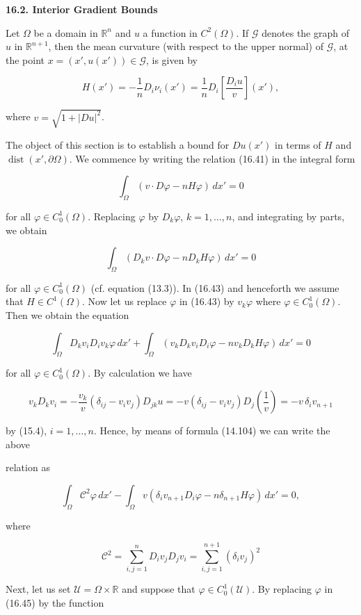 \textbf{16.2. Interior Gradient Bounds}

Let $\Omega$ be a domain in $\mathbb{R}^n$ and $u$ a function in $C^2(\Omega)$. If $\mathcal{G}$ denotes the graph of $u$
in $\mathbb{R}^{n+1}$, then the mean curvature (with respect to the upper normal) of $\mathcal{G}$, at the
point $x=(x',u(x'))\in\mathcal{G}$, is given by

\[
\tag{16.41}
H(x')=-\frac{1}{n}D_i\nu_i(x')
=\frac{1}{n}D_i\!\left[\frac{D_i u}{v}\right](x'),
\]

where $v=\sqrt{1+|Du|^2}$.

The object of this section is to establish a bound for $Du(x')$ in terms of $H$ and
$\operatorname{dist}(x',\partial\Omega)$. We commence by writing the relation (16.41) in the integral form

\[
\tag{16.42}
\int_{\Omega} (v\cdot D\varphi-nH\varphi)\,dx'=0
\]

for all $\varphi\in C_0^1(\Omega)$. Replacing $\varphi$ by $D_k\varphi$, $k=1,\ldots,n$, and integrating by parts, we
obtain

\[
\tag{16.43}
\int_{\Omega} (D_kv\cdot D\varphi-nD_kH\varphi)\,dx'=0
\]

for all $\varphi\in C_0^1(\Omega)$ (cf. equation (13.3)). In (16.43) and henceforth we assume that
$H\in C^1(\Omega)$. Now let us replace $\varphi$ in (16.43) by $v_k\varphi$ where $\varphi\in C_0^1(\Omega)$. Then we obtain
the equation

\[
\tag{16.44}
\int_{\Omega} D_k v_i D_i v_k\varphi\,dx'
+\int_{\Omega} (v_k D_k v_i D_i\varphi-nv_kD_kH\varphi)\,dx'=0
\]

for all $\varphi\in C_0^1(\Omega)$. By calculation we have

\[
v_kD_kv_i=-\frac{v_k}{v}(\delta_{ij}-v_iv_j)D_{jk}u
=-v(\delta_{ij}-v_iv_j)D_j\!\left(\frac{1}{v}\right)
=-v\,\delta_i v_{n+1}
\]

by (15.4), $i=1,\ldots,n$. Hence, by means of formula (14.104) we can write the above


relation as

\[
\tag{16.45}
\int_{\Omega} \mathcal{C}^{2}\varphi\,dx' - \int_{\Omega} v(\delta_i v_{n+1} D_i\varphi - n\delta_{n+1} H\varphi)\,dx' = 0,
\]

where

\[
\mathcal{C}^{2} = \sum_{i,j=1}^{n} D_i v_j D_j v_i = \sum_{i,j=1}^{n+1} (\delta_i v_j)^{2}
\]

Next, let us set $\mathcal{U} = \Omega \times \mathbb{R}$ and suppose that $\varphi \in C_0^1(\mathcal{U})$. By replacing $\varphi$ in (16.45)
by the function

